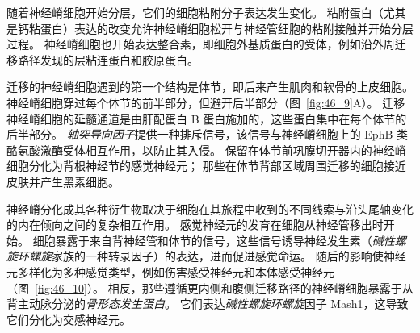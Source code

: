 随着神经嵴细胞开始分层，它们的细胞粘附分子表达发生变化。
粘附蛋白（尤其是钙粘蛋白）表达的改变允许神经嵴细胞松开与神经管细胞的粘附接触并开始分层过程。
神经嵴细胞也开始表达整合素，即细胞外基质蛋白的受体，例如沿外周迁移路径发现的层粘连蛋白和胶原蛋白。


迁移的神经嵴细胞遇到的第一个结构是体节，即后来产生肌肉和软骨的上皮细胞。
神经嵴细胞穿过每个体节的前半部分，但避开后半部分（图~\ref{fig:46_9}A）。
迁移神经嵴细胞的延髓通道是由肝配蛋白 B 蛋白施加的，这些蛋白集中在每个体节的后半部分。
\textit{轴突导向因子}提供一种排斥信号，该信号与神经嵴细胞上的 EphB 类酪氨酸激酶受体相互作用，以防止其入侵。
保留在体节前巩膜切开器内的神经嵴细胞分化为背根神经节的感觉神经元；
那些在体节背部区域周围迁移的细胞接近皮肤并产生黑素细胞。


神经嵴分化成其各种衍生物取决于细胞在其旅程中收到的不同线索与沿头尾轴变化的内在倾向之间的复杂相互作用。
感觉神经元的发育在细胞从神经管移出时开始。
细胞暴露于来自背神经管和体节的信号，这些信号诱导神经发生素（\textit{碱性螺旋环螺旋}家族的一种转录因子）的表达，进而促进感觉命运。
随后的影响使神经元多样化为多种感觉类型，例如伤害感受神经元和本体感受神经元（图~\ref{fig:46_10}）。
相反，那些遵循更内侧和腹侧迁移路径的神经嵴细胞暴露于从背主动脉分泌的\textit{骨形态发生蛋白}。
它们表达\textit{碱性螺旋环螺旋}因子 Mash1，这导致它们分化为交感神经元。


